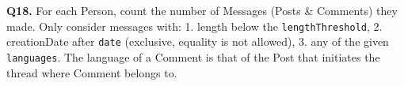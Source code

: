 \textbf{Q18.}
For each Person, count the number of Messages (Posts \& Comments) they
made.
Only consider messages with: 1. length below the \texttt{lengthThreshold}, 2. creationDate after \texttt{date} (exclusive, equality is not allowed), 3. any of the given \texttt{languages}. 
The language of a Comment is that of the Post that initiates the thread
where Comment belongs to.
